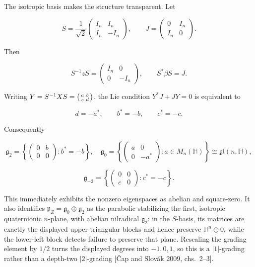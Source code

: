 \documentclass[
  10pt,
  letterpaper,
  oneside]{scrartcl}
\begin{document}
The isotropic basis makes the structure transparent. Let

\[
S=\frac1{\sqrt2}
\begin{pmatrix}
I_n&I_n\\
I_n&-I_n
\end{pmatrix},
\qquad
J=
\begin{pmatrix}
0&I_n\\
I_n&0
\end{pmatrix}.
\]

Then

\[
S^{-1}zS=\begin{pmatrix}I_n&0\\0&-I_n\end{pmatrix},
\qquad
S^*\beta S=J.
\]

Writing \(Y=S^{-1}XS=\begin{psmallmatrix}a&b\\c&d\end{psmallmatrix}\),
the Lie condition \(Y^*J+JY=0\) is equivalent to

\[
d=-a^*,\qquad b^*=-b,\qquad c^*=-c.
\]

Consequently

\[
\mathfrak g_2=
\left\{\begin{pmatrix}0&b\\0&0\end{pmatrix}:b^*=-b\right\},\quad
\mathfrak g_0=
\left\{\begin{pmatrix}a&0\\0&-a^*\end{pmatrix}:a\in M_n(\mathbb H)\right\}
\cong\mathfrak{gl}(n,\mathbb H),
\]

\[
\mathfrak g_{-2}=
\left\{\begin{pmatrix}0&0\\c&0\end{pmatrix}:c^*=-c\right\}.
\]

This immediately exhibits the nonzero eigenspaces as abelian and
square-zero. It also identifies
\(\mathfrak p_Z=\mathfrak g_0\oplus\mathfrak g_2\) as the parabolic
stabilizing the first, isotropic quaternionic \(n\)-plane, with abelian
nilradical \(\mathfrak g_2\): in the \(S\)-basis, its matrices are
exactly the displayed upper-triangular blocks and hence preserve
\(\mathbb H^n\oplus0\), while the lower-left block detects failure to
preserve that plane. Rescaling the grading element by \(1/2\) turns the
displayed degrees into \(-1,0,1\), so this is a \(|1|\)-grading rather
than a depth-two \(|2|\)-grading {[}Čap and Slovák 2009, chs.~2--3{]}.
\end{document}
